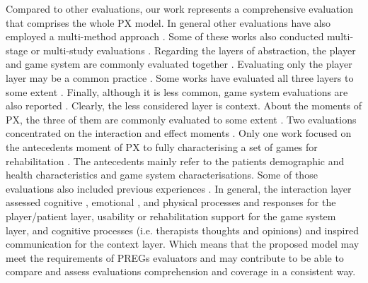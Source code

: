Compared to other evaluations, our work represents a comprehensive evaluation that comprises the whole \ac{PX} model. In general other evaluations have also employed a multi-method approach \autocite{Sinclair2010,Wuest2014,PirovanoAdvisor2012,Ni2014,Brokaw2015,Celinder2012,Hernandez2013,Shin2014,Moran2015,Chang2011,Rand2008,Fitzgerald2008,Saposnik2010}. Some of these works also conducted multi-stage or multi-study evaluations \autocite{Zhang2011,PirovanoAdvisor2012,Brokaw2015,Deutsch2011,Shin2014,Moran2015,Rand2008}. Regarding the layers of abstraction, the player and game system are commonly evaluated together \autocite{Wuest2014,Brokaw2015,Fitzgerald2008,Burke2009,Moran2015,Rand2008,Cameirao2010,Celinder2012}. Evaluating only the player layer may be a common practice \autocite{Sinclair2010,Zhang2011,Saposnik2010,Chang2011,Hernandez2013}. Some works have evaluated all three layers to some extent \autocite{Ni2014,Shin2014,Brokaw2015,PirovanoAdvisor2012}. Finally, although it is less common, game system evaluations are also reported \autocite{Deutsch2011, Sugarman2009}. Clearly, the less considered layer is context. About the moments of \ac{PX}, the three of them are commonly evaluated to some extent \autocite{PirovanoAdvisor2012,Wuest2014,Chang2011,Berkovsky2010,Hernandez2013,Celinder2012,Sugarman2009,Brokaw2015,Ni2014,Saposnik2010}. Two evaluations concentrated on the interaction and effect moments \autocite{Zhang2011,Rand2008}. Only one work focused on the antecedents moment of \ac{PX} to fully characterising a set of games for rehabilitation \autocite{Deutsch2011}. The antecedents mainly refer to the patients demographic and health characteristics and game system characterisations. Some of those evaluations also included previous experiences \autocite{Chang2011,Moran2015}. In general, the interaction layer assessed cognitive \autocite{Rand2008,Celinder2012,Hernandez2013,Shin2014,Fitzgerald2008}, emotional \autocite{Celinder2012,Sinclair2010,Zhang2011,Brokaw2015,Sugarman2009,Cameirao2010,Hernandez2013,Berkovsky2010,Moran2015,Rand2008,Burke2009}, and physical \autocite{Wuest2014,PirovanoAdvisor2012,Brokaw2015,Sugarman2009,Berkovsky2010} processes and responses for the player/patient layer, usability \autocite{Zhang2011,Celinder2012,PirovanoAdvisor2012,Brokaw2015,Cameirao2010,Moran2015,Fitzgerald2008} or rehabilitation support \autocite{Deutsch2011,Shin2014,Chang2011,Rand2008,Burke2009,Saposnik2010} for the game system layer, and cognitive processes \autocite{PirovanoAdvisor2012,Shin2014,Brokaw2015} (i.e. therapists thoughts and opinions) and inspired communication \autocite{Celinder2012} for the context layer. Which means that the proposed model may meet the requirements of \acp{PREG} evaluators and may contribute to be able to compare and assess evaluations comprehension and coverage in a consistent way.


